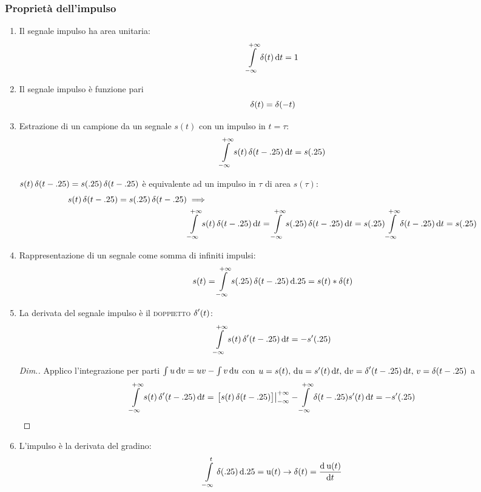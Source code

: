 \subsubsection{Proprietà dell'impulso}
\begin{enumerate}
	\item Il segnale impulso ha area unitaria:
	\begin{equation}
	\intinf{\impulse(t)}{t}=1
	\end{equation}
	\item Il segnale impulso è funzione pari 
	\begin{equation}
	\impulse(t)=\impulse(-t)
	\end{equation}
	\item Estrazione di un campione da un segnale $s(t)$ con un impulso in $t=\tau$:
	\begin{equation}
	\intinf{s(t)\impulse(t-\tau)}{t}=s(\tau)
	\end{equation}
	
	$s(t)\impulse(t-\tau)=s(\tau)\impulse(t-\tau)$ è equivalente ad un impulso in $\tau$ di area $s(\tau)$:
	\begin{align*}
	s(t)\impulse(t-\tau)=s(\tau)\impulse(t-\tau) &\implies \\ 
	& \intinf{s(t)\impulse(t-\tau)}{t} =\intinf{s(\tau)\impulse(t-\tau)}{t} = s(\tau)\intinf{\impulse(t-\tau)}{t} = s(\tau)
	\end{align*}
	
	\item Rappresentazione di un segnale come somma di infiniti impulsi:
	\begin{equation}
	s(t)=\intinf{s(\tau)\impulse(t-\tau)}{\tau}=s(t)\ast\impulse(t)
	\end{equation}
	
	\item La derivata del segnale impulso è il \textsc{doppietto} $\impulse'(t)$:
	\begin{equation}
	\intinf{s(t)\impulse'(t-\tau)}{t}=-s'(\tau)
	\end{equation}
	
	\begin{proof}[Dim.]
		Applico l'integrazione per parti $\int{u\diff v}=u v-\int{v\diff u}$ con $u=s(t) ,\, \diff u=s'(t)\diff t ,\, \diff v=\impulse'(t-\tau)\diff t ,\, v=\impulse(t-\tau)$  a 
		\[\intinf{s(t)\impulse'(t-\tau)}{t}= \restrict{\bigl[ s(t)\impulse(t-\tau)\bigr]}{-\infty}^{+\infty} -\intinf{\impulse(t-\tau)s'(t)}{t}=-s'(\tau)\]
	\end{proof}
	\item L'impulso è la derivata del gradino:
	\begin{equation}
	\intd{-\infty}{t}{\impulse(\tau)}{\tau}=\step(t) \to \impulse(t)=\deriv{\step(t)}{t}
	\end{equation}
	

\end{enumerate}

